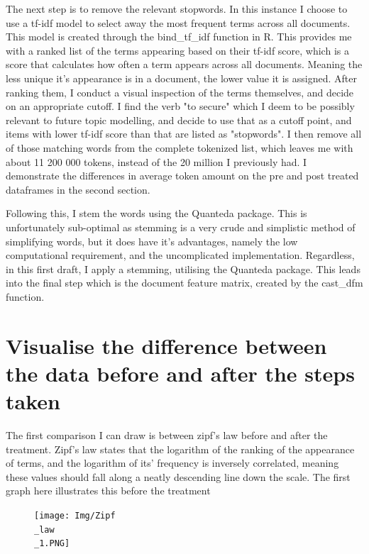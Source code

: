 \documentclass[12pt]{article}
\begin{document}
	The next step is to remove the relevant stopwords. In this instance I choose to use a tf-idf model to select away the most frequent terms across all documents. This model is created through the bind\_tf\_idf function in R. This provides me with a ranked list of the terms appearing based on their tf-idf score, which is a score that calculates how often a term appears across all documents. Meaning the less unique it's appearance is in a document, the lower value it is assigned. After ranking them, I conduct a visual inspection of the terms themselves, and decide on an appropriate cutoff. I find the verb "to secure" which I deem to be possibly relevant to future topic modelling, and decide to use that as a cutoff point, and items with lower tf-idf score than that are listed as "stopwords". I then remove all of those matching words from the complete tokenized list, which leaves me with about 11 200 000 tokens, instead of the 20 million I previously had. I demonstrate the differences in average token amount on the pre and post treated dataframes in the second section. 
	
	Following this, I stem the words using the Quanteda package. This is unfortunately sub-optimal as stemming is a very crude and simplistic method of simplifying words, but it does have it's advantages, namely the low computational requirement, and the uncomplicated implementation. Regardless, in this first draft, I apply a stemming, utilising the Quanteda package. This leads into the final step which is the document feature matrix, created by the cast\_dfm function. 
	
	\section{Visualise the difference between the data before and after the steps taken}
	
	The first comparison I can draw is between zipf's law before and after the treatment. Zipf's law states that the logarithm of the ranking of the appearance of terms, and the logarithm of its' frequency is inversely correlated, meaning these values should fall along a neatly descending line down the scale. The first graph here illustrates this before the treatment
	
	\begin{figure}[h]
		\texttt{[image: Img/Zipf\\\_law\\\_1.PNG]}
	\end{figure}
	
\end{document}
